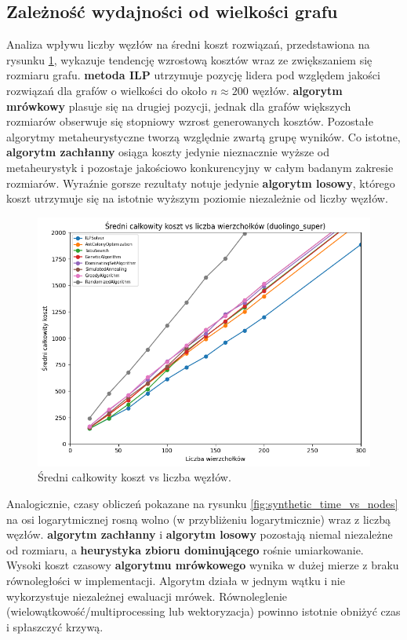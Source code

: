 \subsection{Zależność wydajności od wielkości grafu}

Analiza wpływu liczby węzłów na średni koszt rozwiązań, przedstawiona na rysunku \ref{fig:synthetic_cost_vs_nodes}, wykazuje tendencję wzrostową kosztów wraz ze zwiększaniem się rozmiaru grafu. \textbf{metoda ILP} utrzymuje pozycję lidera pod względem jakości rozwiązań dla grafów o wielkości do około $n \approx 200$ węzłów. \textbf{algorytm mrówkowy} plasuje się na drugiej pozycji, jednak dla grafów większych rozmiarów obserwuje się stopniowy wzrost generowanych kosztów. Pozostałe algorytmy metaheurystyczne tworzą względnie zwartą grupę wyników. Co istotne, \textbf{algorytm zachłanny} osiąga koszty jedynie nieznacznie wyższe od metaheurystyk i pozostaje jakościowo konkurencyjny w całym badanym zakresie rozmiarów. Wyraźnie gorsze rezultaty notuje jedynie \textbf{algorytm losowy}, którego koszt utrzymuje się na istotnie wyższym poziomie niezależnie od liczby węzłów.

\begin{figure}[H]
  \centering
  \includegraphics[width=0.7\linewidth]{assets/figures/synthetic_cost_vs_nodes.png}
  \caption{Średni całkowity koszt vs liczba węzłów.}
  \label{fig:synthetic_cost_vs_nodes}
\end{figure}

Analogicznie, czasy obliczeń pokazane na rysunku \ref{fig:synthetic_time_vs_nodes} na osi logarytmicznej rosną wolno (w przybliżeniu logarytmicznie) wraz z liczbą węzłów. \textbf{algorytm zachłanny} i \textbf{algorytm losowy} pozostają niemal niezależne od rozmiaru, a \textbf{heurystyka zbioru dominującego} rośnie umiarkowanie. Wysoki koszt czasowy \textbf{algorytmu mrówkowego} wynika w dużej mierze z braku równoległości w implementacji. Algorytm działa w jednym wątku i nie wykorzystuje niezależnej ewaluacji mrówek. Równoleglenie (wielowątkowość/multiprocessing lub wektoryzacja) powinno istotnie obniżyć czas i spłaszczyć krzywą.

